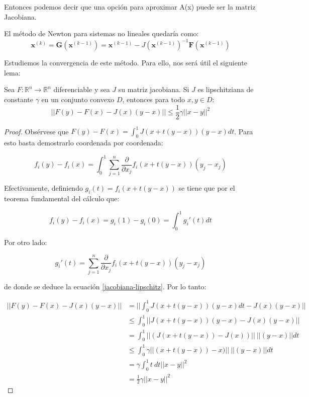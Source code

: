 Entonces podemos decir que una opción para aproximar A(x) puede ser la matriz Jacobiana.

El método de Newton para sistemas no lineales quedaría como:
\[\mathbf{x}^{(k)}=\mathbf{G}\left(\mathbf{x}^{(k-1)}\right)=\mathbf{x}^{(k-1)}-J\left(\mathbf{x}^{(k-1)}\right)^{-1} \mathbf{F}\left(\mathbf{x}^{(k-1)}\right)\]

Estudiemos la convergencia de este método. Para ello, nos será útil el siguiente lema:

\begin{lemma}
Sea $F : \mathbb{R}^n \to \mathbb{R}^n$ diferenciable y sea $J$ su matriz jacobiana. Si $J$ es lipschitziana de constante $\gamma$  en un conjunto convexo $D$, entonces para todo $x,y \in D$:
\[ || F(y)-F(x)-J(x)(y-x) || \leq \frac{1}{2} \gamma ||x-y||^2 \]
\end{lemma}
\begin{proof}
Obsérvese que $F(y)-F(x) = \int_0^1 J(x + t(y-x))(y-x) dt$. Para esto basta demostrarlo coordenada por coordenada:

\begin{equation}\label{jacobiana-lipschitz} f_i(y)-f_i(x) = \int_0^1 \sum_{j=1}^n \frac{\partial}{\partial x_j} f_i(x + t(y-x))(y_j-x_j)\end{equation}

Efectivamente, definiendo $g_i(t) = f_i(x+t(y-x))$ se tiene que por el teorema fundamental del cálculo que:

\[ f_i(y)-f_i(x) = g_i(1) - g_i(0) = \int_0^1 g_i'(t) dt \]

Por otro lado:

\[ g_i'(t) = \sum_{j=1}^n \frac{\partial}{\partial x_j} f_i(x + t(y-x))(y_j-x_j) \]

de donde se deduce la ecuación \eqref{jacobiana-lipschitz}. Por lo tanto:

\begin{align*}||F(y)-F(x) - J(x)(y-x)|| & = ||\int_0^1 J(x + t(y-x))(y-x) dt- J(x)(y-x)||\\
& \leq \int_0^1 ||J(x + t(y-x))(y-x)- J(x)(y-x)||\\
& = \int_0^1 ||(J(x + t(y-x))- J(x))||\ ||(y-x)|| dt\\
& \leq \int_0^1 \gamma ||(x + t(y-x)) - x)||\ ||(y-x)|| dt\\
& = \gamma \int_0^1 t\ dt ||x-y||^2\\
& = \frac{1}{2} \gamma ||x-y||^2
\end{align*}
\end{proof}


